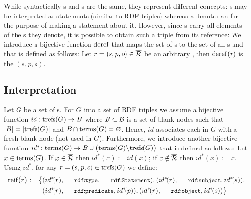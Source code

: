 While syntactically {\RDFplusTriple}s and {\TRef}s are the same, they represent different concepts: {\RDFplusTriple}s may be interpreted as statements (similar to RDF triples) whereas a {\TRef} denotes an {\RDFplusTriple}
	for the purpose of making a statement about it.
%
However, since {\TRef}s carry all elements of the {\RDFplusTriple}s they denote, it is possible to obtain such a triple from its reference: We introduce a bijective function $\mathrm{deref}$ that maps the set of {\TRef}s to the set of all {\RDFplusTriple}s and that is defined as follows: Let $r=(s,p,o) \in \overline{\mathcal{R}}$ be an arbitrary {\TRef}, then $\mathrm{deref}(r)$ is the {\RDFplusTriple} $(s,p,o)$.


\subsection{Interpretation}

Let $G$ be a set of {\RDFplusTriple}s. For  $G$ into a set of RDF triples we assume a bijective function $id : \mathrm{trefs}(G) \rightarrow B$ where $B \subset \mathcal{B}$ is a set of blank nodes such that $| B | = | \mathrm{trefs}(G) |$ and $B \cap \mathrm{terms}(G) = \varnothing$. Hence, $id$ associates each {\TRef} in $G$ with a fresh blank node (not used in $G$). Furthermore, we introduce
	another bijective function $id^*\! : \mathrm{terms}(G) \rightarrow B \cup \bigl( \mathrm{terms}(G) \!\setminus\! \mathrm{trefs}(G) \bigr)$
that is defined as follows: Let $x \in \mathrm{terms}(G)$. If $x \in \overline{\mathcal{R}}$ then $id^*\!(x) := id(x)$; if $x \notin \overline{\mathcal{R}}$ then $id^*\!(x) := x$.
%
Using $id^*$, for any {\TRef} $r = (s,p,o) \in \mathrm{trefs}(G)$ we define:
\begin{align*}
	\mathrm{reif}\bigl( r \bigr) := \big\lbrace
		& (id^*\!(r),\mathTinyRDF{rdf\!:\!type},\mathTinyRDF{rdf\!:\!Statement}),
		(id^*\!(r),\mathTinyRDF{rdf\!:\!subject},id^*\!(s)), \\
		& (id^*\!(r),\mathTinyRDF{rdf\!:\!predicate},id^*\!(p)),
		(id^*\!(r),\mathTinyRDF{rdf\!:\!object},id^*\!(o))
	\big\rbrace
\end{align*}

